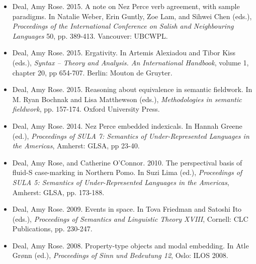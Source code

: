 \documentclass[12pt]{article}
\begin{document}
\begin{itemize}[labelsep=.5cm,leftmargin=0cm,itemindent=0cm]
  \item   Deal, Amy Rose. 2015. A note on Nez Perce verb agreement, with sample paradigms. In Natalie Weber, Erin Guntly, Zoe Lam, and Sihwei Chen (eds.), \emph{Proceedings of the International Conference on Salish and Neighbouring Languages} 50, pp. 389-413. Vancouver: UBCWPL. 


  \item Deal, Amy Rose. 2015. Ergativity. In Artemis Alexiadou and Tibor Kiss (eds.), \emph{Syntax -- Theory and Analysis. An International Handbook}, volume 1, chapter 20, pp 654-707. Berlin: Mouton de Gruyter.

  \item Deal, Amy Rose. 2015. Reasoning about equivalence in semantic fieldwork. In  M. Ryan Bochnak and Lisa Matthewson (eds.), \emph{Methodologies in semantic fieldwork}, pp. 157-174. Oxford University Press.

\item
Deal, Amy Rose. 2014. Nez Perce embedded indexicals. In Hannah Greene (ed.), \textit{Proceedings of SULA 7: Semantics of Under-Represented Languages in the Americas}, Amherst: GLSA, pp 23-40. 

  \item Deal, Amy Rose, and Catherine O'Connor. 2010. The perspectival basis of fluid-S case-marking in Northern Pomo.  In Suzi Lima (ed.), \textit{Proceedings of SULA 5: Semantics of Under-Represented Languages in the Americas}, Amherst: GLSA, pp. 173-188.  



   \item Deal, Amy Rose. 2009. Events in space. In Tova Friedman and Satoshi Ito (eds.), \textit{Proceedings of Semantics and Linguistic Theory XVIII}, Cornell: CLC Publications, pp. 230-247.


   \item Deal, Amy Rose. 2008. Property-type objects and modal embedding. In Atle Gr\o nn (ed.), \textit{Proceedings of Sinn und Bedeutung 12}, Oslo: ILOS 2008. 



\end{itemize}
\end{document}
